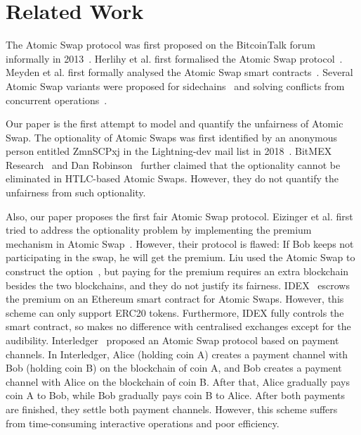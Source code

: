\section{Related Work}
\label{sec:related_work}

The Atomic Swap protocol was first proposed on the BitcoinTalk forum informally in 2013~\cite{nolan2013alt}.
Herlihy et al. first formalised the Atomic Swap protocol~\cite{herlihy2018atomic}.
Meyden et al. first formally analysed the Atomic Swap smart contracts~\cite{van2018specification}.
Several Atomic Swap variants were proposed for sidechains~\cite{robinson2019atomic} and solving conflicts from concurrent operations~\cite{zakhary2019atomic}.

Our paper is the first attempt to model and quantify the unfairness of Atomic Swap.
The optionality of Atomic Swaps was first identified by an anonymous person entitled ZmnSCPxj in the Lightning-dev mail list in 2018~\cite{optionality-origin}.
BitMEX Research~\cite{bitmex-inadvertent-call-option} and Dan Robinson~\cite{htlcs-considered-harmful} further claimed that the optionality cannot be eliminated in HTLC-based Atomic Swaps.
However, they do not quantify the unfairness from such optionality.

Also, our paper proposes the first fair Atomic Swap protocol.
Eizinger et al. first tried to address the optionality problem by implementing the premium mechanism in Atomic Swap~\cite{first-attempt-optionality}. However, their protocol is flawed: If Bob keeps not participating in the swap, he will get the premium.
Liu used the Atomic Swap to construct the option~\cite{liu2018atomic}, but paying for the premium requires an extra blockchain besides the two blockchains, and they do not justify its fairness.
IDEX~\cite{idex-whitepaper} escrows the premium on an Ethereum smart contract for Atomic Swaps. However, this scheme can only support ERC20 tokens. Furthermore, IDEX fully controls the smart contract, so makes no difference with centralised exchanges except for the audibility.
Interledger~\cite{interledger-whitepaper} proposed an Atomic Swap protocol based on payment channels.
In Interledger, Alice (holding coin A) creates a payment channel with Bob (holding coin B) on the blockchain of coin A, and Bob creates a payment channel with Alice on the blockchain of coin B. After that, Alice gradually pays coin A to Bob, while Bob gradually pays coin B to Alice. After both payments are finished, they settle both payment channels.
However, this scheme suffers from time-consuming interactive operations and poor efficiency.